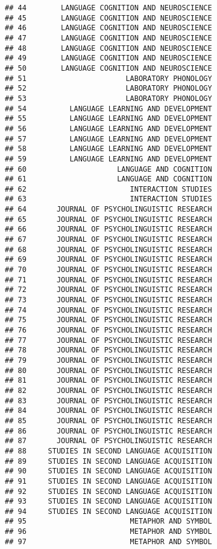 \documentclass[
  english,
  man]{apa6}
\begin{document}
\begin{verbatim}
## 44        LANGUAGE COGNITION AND NEUROSCIENCE
## 45        LANGUAGE COGNITION AND NEUROSCIENCE
## 46        LANGUAGE COGNITION AND NEUROSCIENCE
## 47        LANGUAGE COGNITION AND NEUROSCIENCE
## 48        LANGUAGE COGNITION AND NEUROSCIENCE
## 49        LANGUAGE COGNITION AND NEUROSCIENCE
## 50        LANGUAGE COGNITION AND NEUROSCIENCE
## 51                       LABORATORY PHONOLOGY
## 52                       LABORATORY PHONOLOGY
## 53                       LABORATORY PHONOLOGY
## 54          LANGUAGE LEARNING AND DEVELOPMENT
## 55          LANGUAGE LEARNING AND DEVELOPMENT
## 56          LANGUAGE LEARNING AND DEVELOPMENT
## 57          LANGUAGE LEARNING AND DEVELOPMENT
## 58          LANGUAGE LEARNING AND DEVELOPMENT
## 59          LANGUAGE LEARNING AND DEVELOPMENT
## 60                     LANGUAGE AND COGNITION
## 61                     LANGUAGE AND COGNITION
## 62                        INTERACTION STUDIES
## 63                        INTERACTION STUDIES
## 64       JOURNAL OF PSYCHOLINGUISTIC RESEARCH
## 65       JOURNAL OF PSYCHOLINGUISTIC RESEARCH
## 66       JOURNAL OF PSYCHOLINGUISTIC RESEARCH
## 67       JOURNAL OF PSYCHOLINGUISTIC RESEARCH
## 68       JOURNAL OF PSYCHOLINGUISTIC RESEARCH
## 69       JOURNAL OF PSYCHOLINGUISTIC RESEARCH
## 70       JOURNAL OF PSYCHOLINGUISTIC RESEARCH
## 71       JOURNAL OF PSYCHOLINGUISTIC RESEARCH
## 72       JOURNAL OF PSYCHOLINGUISTIC RESEARCH
## 73       JOURNAL OF PSYCHOLINGUISTIC RESEARCH
## 74       JOURNAL OF PSYCHOLINGUISTIC RESEARCH
## 75       JOURNAL OF PSYCHOLINGUISTIC RESEARCH
## 76       JOURNAL OF PSYCHOLINGUISTIC RESEARCH
## 77       JOURNAL OF PSYCHOLINGUISTIC RESEARCH
## 78       JOURNAL OF PSYCHOLINGUISTIC RESEARCH
## 79       JOURNAL OF PSYCHOLINGUISTIC RESEARCH
## 80       JOURNAL OF PSYCHOLINGUISTIC RESEARCH
## 81       JOURNAL OF PSYCHOLINGUISTIC RESEARCH
## 82       JOURNAL OF PSYCHOLINGUISTIC RESEARCH
## 83       JOURNAL OF PSYCHOLINGUISTIC RESEARCH
## 84       JOURNAL OF PSYCHOLINGUISTIC RESEARCH
## 85       JOURNAL OF PSYCHOLINGUISTIC RESEARCH
## 86       JOURNAL OF PSYCHOLINGUISTIC RESEARCH
## 87       JOURNAL OF PSYCHOLINGUISTIC RESEARCH
## 88     STUDIES IN SECOND LANGUAGE ACQUISITION
## 89     STUDIES IN SECOND LANGUAGE ACQUISITION
## 90     STUDIES IN SECOND LANGUAGE ACQUISITION
## 91     STUDIES IN SECOND LANGUAGE ACQUISITION
## 92     STUDIES IN SECOND LANGUAGE ACQUISITION
## 93     STUDIES IN SECOND LANGUAGE ACQUISITION
## 94     STUDIES IN SECOND LANGUAGE ACQUISITION
## 95                        METAPHOR AND SYMBOL
## 96                        METAPHOR AND SYMBOL
## 97                        METAPHOR AND SYMBOL

\end{verbatim}
\end{document}

